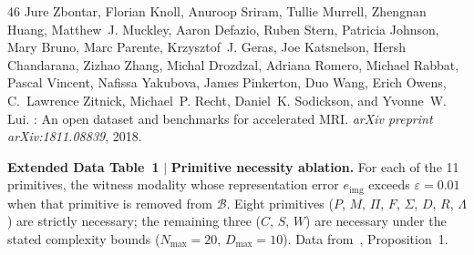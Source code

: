 \documentclass[11pt]{article}
\newcommand{\Blib}{\mathcal{B}}
\newcommand{\etier}{e_{\mathrm{img}}}
\begin{document}
\begin{thebibliography}{46}
Jure Zbontar, Florian Knoll, Anuroop Sriram, Tullie Murrell, Zhengnan Huang,
  Matthew~J. Muckley, Aaron Defazio, Ruben Stern, Patricia Johnson, Mary Bruno,
  Marc Parente, Krzysztof~J. Geras, Joe Katsnelson, Hersh Chandarana, Zizhao
  Zhang, Michal Drozdzal, Adriana Romero, Michael Rabbat, Pascal Vincent,
  Nafissa Yakubova, James Pinkerton, Duo Wang, Erich Owens, C.~Lawrence
  Zitnick, Michael~P. Recht, Daniel~K. Sodickson, and Yvonne~W. Lui.
: An open dataset and benchmarks for accelerated {MRI}.
\newblock \emph{arXiv preprint arXiv:1811.08839}, 2018.

\end{thebibliography}




\clearpage
\noindent\textbf{Extended Data Table~1} $|$ \textbf{Primitive necessity ablation.} For each of the 11 primitives, the witness modality whose representation error $\etier$ exceeds $\varepsilon = 0.01$ when that primitive is removed from $\Blib$. Eight primitives ($P$, $M$, $\Pi$, $F$, $\Sigma$, $D$, $R$, $\Lambda$) are strictly necessary; the remaining three ($C$, $S$, $W$) are necessary under the stated complexity bounds ($N_{\max} = 20$, $D_{\max} = 10$). Data from~\cite{yang2026fpt}, Proposition~1.
\end{document}

